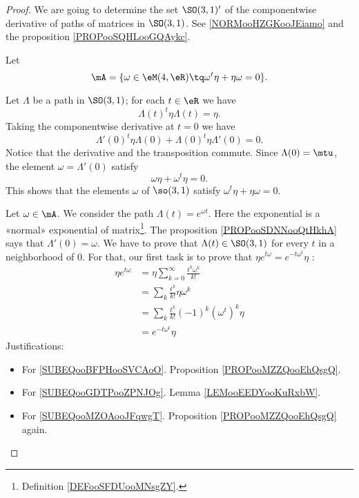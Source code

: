 \begin{proof}
	We are going to determine the set \( \SO(3,1)'\) of the componentwise derivative of paths of matrices in \( \SO(3,1)\). See \ref{NORMooHZGKooJEiamo} and the proposition \ref{PROPooSQHLooGQAykc}.

	Let
	\begin{equation}
		\mA=\{ \omega\in\eM(4,\eR)\tq \omega^t\eta+\eta\omega=0 \}.
	\end{equation}

	\begin{subproof}
		\spitem[\( SO(3,1)'\subset \mA\)]

		Let \( \Lambda\) be a path in \( \SO(3,1)\); for each \( t\in \eR\) we have
		\begin{equation}
			\Lambda(t)^t\eta\Lambda(t)=\eta.
		\end{equation}
		Taking the componentwise derivative at \( t=0\) we have
		\begin{equation}
			\Lambda'(0)^t\eta\Lambda(0)+\Lambda(0)^t\eta\Lambda'(0)=0.
		\end{equation}
		Notice that the derivative and the transposition commute. Since \( \Lambda(0)=\mtu\), the element \( \omega=\Lambda'(0)\) satisfy
		\begin{equation}
			\omega\eta+\omega^t\eta=0.
		\end{equation}
		This shows that the elements \( \omega\) of \( \so(3,1)\) satisfy \( \omega^t\eta+\eta\omega=0\).

		\spitem[\( \mA\subset \SO(3,1)\)]
		Let \( \omega\in \mA\). We consider the path \( \Lambda(t)= e^{\omega t}\). Here the exponential is a «normal» exponential of matrix\footnote{Definition \ref{DEFooSFDUooMNsgZY}.}. The proposition \ref{PROPooSDNNooQtHkhA} says that \( \Lambda'(0)=\omega\). We have to prove that \( \Lambda(t)\in \SO(3,1)\) for every \( t\) in a neighborhood of \( 0\). For that, our first task is to prove that \( \eta e^{t\omega}= e^{-t\omega^t}\eta\) :
		\begin{subequations}
			\begin{align}
				\eta e^{t\omega} & =\eta\sum_{k=0}^{\infty}\frac{ t^k\omega^k }{ k! }                             \\
				                 & =\sum_k\frac{ t^k }{ k! }\eta\omega^k          \label{SUBEQooBFPHooSVCAoO}     \\
				                 & =\sum_k\frac{ t^k }{ k! }(-1)^k(\omega^t)^k\eta    \label{SUBEQooGDTPooZPNJOg} \\
				                 & = e^{-t\omega^t}\eta        \label{SUBEQooMZOAooJFqwgT}
			\end{align}
		\end{subequations}
		Justifications:
		\begin{itemize}
			\item For \eqref{SUBEQooBFPHooSVCAoO}. Proposition \ref{PROPooMZZQooEhQsgQ}.
			\item For \eqref{SUBEQooGDTPooZPNJOg}. Lemma \ref{LEMooEEDYooKuRxbW}.
			\item For \eqref{SUBEQooMZOAooJFqwgT}. Proposition \ref{PROPooMZZQooEhQsgQ} again.
		\end{itemize}


\end{subproof}
\end{proof}
